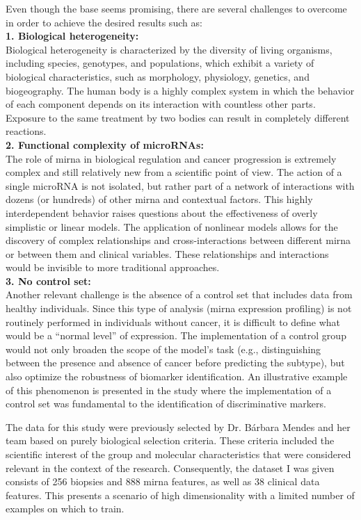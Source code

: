Even though the base seems promising, there are several challenges to overcome
in order to achieve the desired results such as: \\ \textbf{1. Biological
  heterogeneity:} \\ \label{sec:biological-heterogeneity} Biological
heterogeneity is characterized by the diversity of living organisms, including
species, genotypes, and populations, which exhibit a variety of biological
characteristics, such as morphology, physiology, genetics, and biogeography.
The human body is a highly complex system in which the behavior of each
component depends on its interaction with countless other parts. Exposure to
the same treatment by two bodies can result in completely different reactions.
\\ \textbf{2. Functional complexity of microRNAs:} \\ The role of \gls{mirna}
in biological regulation and cancer progression is extremely complex and still
relatively new from a scientific point of view. The action of a single microRNA
is not isolated, but rather part of a network of interactions with dozens (or
hundreds) of other \gls{mirna} and contextual factors. This highly
interdependent behavior raises questions about the effectiveness of overly
simplistic or linear models. The application of nonlinear models allows for the
discovery of complex relationships and cross-interactions between different
\gls{mirna} or between them and clinical variables. These relationships and
interactions would be invisible to more traditional approaches. \\ \textbf{3.
  No control set:} \\ Another relevant challenge is the absence of a control set
that includes data from healthy individuals. Since this type of analysis
(\gls{mirna} expression profiling) is not routinely performed in individuals
without cancer, it is difficult to define what would be a “normal level” of
expression. The implementation of a control group would not only broaden the
scope of the model's task (e.g., distinguishing between the presence and
absence of cancer before predicting the subtype), but also optimize the
robustness of biomarker identification. An illustrative example of this
phenomenon is presented in the study \textcite{ml_gastric_Azari2023} where the
implementation of a control set was fundamental to the identification of
discriminative markers.

The data for this study were previously selected by Dr. Bárbara Mendes and her
team based on purely biological selection criteria. These criteria included the
scientific interest of the group and molecular characteristics that were
considered relevant in the context of the research.
Consequently, the dataset I was given consists of 256 biopsies and 888
\gls{mirna} features, as well as 38 clinical data features. This presents a
scenario of high dimensionality with a limited number of examples on which to
train.

